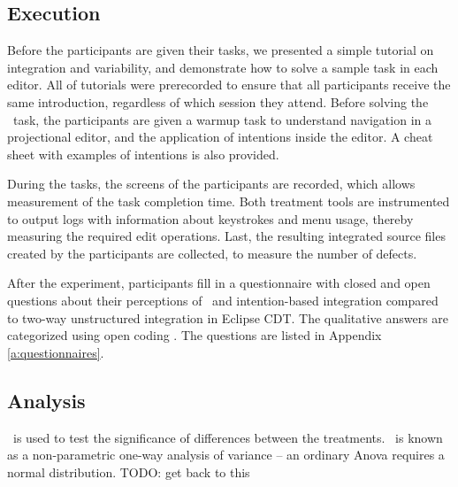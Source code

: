 \subsection{Execution}

Before the participants are given their tasks, we presented a simple tutorial on integration and variability, and demonstrate how to solve a sample task in each editor. All of tutorials were prerecorded to ensure that all participants receive the same introduction, regardless of which session they attend. Before solving the \tooln~task, the participants are given a warmup task to understand navigation in a projectional editor, and the application of intentions inside the editor. A cheat sheet with examples of intentions is also provided.

During the tasks, the screens of the participants are recorded, which allows measurement of the task completion time. Both treatment tools are instrumented to output logs with information about keystrokes and menu usage, thereby measuring the required edit operations. Last, the resulting integrated source files created by the participants are collected, to measure the number of defects.

After the experiment, participants fill in a questionnaire with closed and open questions about their perceptions of \tooln~and intention-based integration compared to two-way unstructured integration in Eclipse CDT. The qualitative answers are categorized using open coding \cite{}. The questions are listed in Appendix \ref{a:questionnaires}.

\subsection{Analysis}
\anova~is used to test the significance of differences between the treatments. \anova~is known as a non-parametric one-way analysis of variance -- an ordinary Anova requires a normal distribution. TODO: get back to this